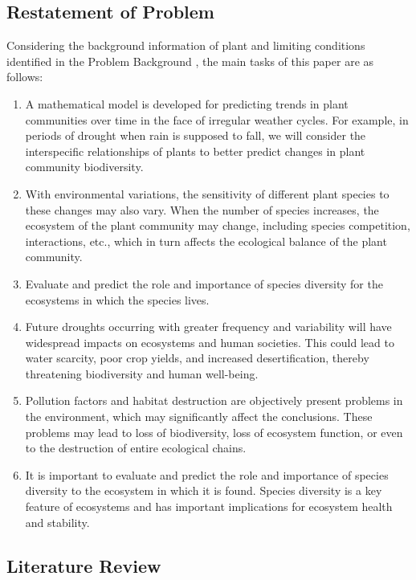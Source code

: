 \documentclass[12pt]{article}
\begin{document}
\subsection{Restatement of Problem}

Considering the background information of plant and limiting conditions identified in the Problem Background , the main tasks of this paper are as follows:

\begin{enumerate}
	\item A mathematical model is developed for predicting trends in plant communities over time in the face of irregular weather cycles. For example, in periods of drought when rain is supposed to fall, we will consider the interspecific relationships of plants to better predict changes in plant community biodiversity.
	\item With environmental variations, the sensitivity of different plant species to these changes may also vary. When the number of species increases, the ecosystem of the plant community may change, including species competition, interactions, etc., which in turn affects the ecological balance of the plant community.
	\item Evaluate and predict the role and importance of species diversity for the ecosystems in which the species lives.
	\item Future droughts occurring with greater frequency and variability will have widespread impacts on ecosystems and human societies. This could lead to water scarcity, poor crop yields, and increased desertification, thereby threatening biodiversity and human well-being.
	\item Pollution factors and habitat destruction are objectively present problems in the environment, which may significantly affect the conclusions. These problems may lead to loss of biodiversity, loss of ecosystem function, or even to the destruction of entire ecological chains.
	\item It is important to evaluate and predict the role and importance of species diversity to the ecosystem in which it is found. Species diversity is a key feature of ecosystems and has important implications for ecosystem health and stability.
\end{enumerate}

\subsection{Literature Review}
\end{document}
